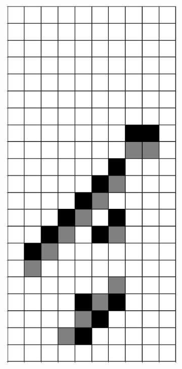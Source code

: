 \documentclass[12pt]{article}
\numberwithin{figure}{section} %
\begin{document}
\begin{figure}[H]
\begin{subfigure}{0.3\textwidth}
     		\subcaption{}
   	\end{subfigure}
        \begin{subfigure}{0.3\textwidth}
     		\centering
     		\includegraphics[angle=270,width=\linewidth]{Section4/23.2}

\end{subfigure}
\end{figure}
\end{document}
